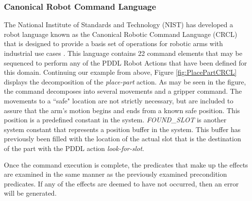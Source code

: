\subsubsection{Canonical Robot Command Language}
The National Institute of Standards and Technology (NIST) has developed a
robot language known
as the Canonical Robotic Command Language (CRCL) that is designed to provide
a basis set of operations for robotic arms with industrial use 
cases \cite{Balakirsky2012-1}. This language contains 22 command elements that
may be sequenced to perform any of the PDDL Robot Actions that have been defined
for this domain. Continuing our example from above, 
Figure \ref{fig:PlacePartCRCL} displays the decomposition of the \textit{place-part} action.
As may be seen in the figure, the command decomposes into several movements and a gripper
command. The movements to a ``safe" location are not strictly necessary, but are
included to assure that the arm's motion begins and ends from a known safe position.
This position is a predefined constant in the system.
\textit{FOUND\_SLOT} is another system constant that represents a position buffer in 
the system. This buffer has previously been filled with the location of the actual
slot that is the destination of the part with the PDDL action 
\textit{look-for-slot}. 

Once the command execution is complete, the predicates that make up the effects
are examined in the same manner as the previously examined precondition predicates.
If any of the effects are deemed to have not occurred, then an error will be
generated.
